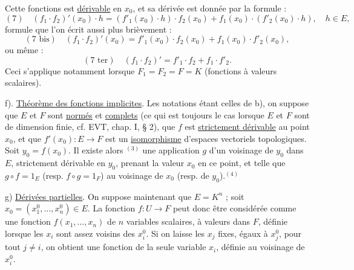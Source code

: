 Cette fonctions est \uline{dérivable} en $x_0$, et sa dérivée est donnée par la formule :
\[
(7)\quad (f_1\cdot f_2)'(x_0)\cdot h=(f'_1(x_0)\cdot h)\cdot f_2(x_0)+f_1(x_0)\cdot(f'_2(x_0)\cdot h),\quad h\in E,
\]
formule que l'on écrit aussi plus brièvement :
\[
(7\text{ bis})\quad (f_1\cdot f_2)'(x_0)=f'_1(x_0)\cdot f_2(x_0)+f_1(x_0)\cdot f'_2(x_0),
\]
ou même :
\[
(7\text{ ter})\quad (f_1\cdot f_2)'=f'_1\cdot f_2+f_1\cdot f'_2.
\]
Ceci s'applique notamment lorsque $F_1=F_2=F=K$ (fonctions à valeurs scalaires).

f). \uline{Théorème des fonctions implicites}. Les notations étant celles de b), on suppose que $E$ et $F$ sont \uline{normés} et \uline{complets} (ce qui est toujours le cas lorsque $E$ et $F$ sont de dimension finie, cf. EVT, chap. I, § 2), que $f$ est \uline{strictement dérivable} au point $x_0$, et que $f'(x_0):E\longrightarrow F$ est un \uline{isomorphisme} d'espaces vectoriels topologiques. Soit $y_0=f(x_0)$. Il existe alors $^{(3)}$ une application $g$ d'un voisinage de $y_0$ dans $E$, strictement dérivable en $y_0$, prenant la valeur $x_0$ en ce point, et telle que $g\circ f=1_E$ (resp. $f\circ g=1_F$) au voisinage de $x_0$ (resp. de $y_0$).$^{(4)}$

g) \uline{Dérivées partielles}. On suppose maintenant que $E=K^n$ ; soit $x_0=(x_1^0,\ldots,x_n^0)\in E$. La fonction $f:U\to F$ peut donc être considérée comme une fonction $f(x_1,\ldots,x_n)$ de $n$ variables scalaires, à valeurs dans $F$, définie lorsque les $x_i$ sont assez voisins des $x_i^0$. Si on laisse les $x_j$ fixes, égaux à $x_j^0$, pour tout $j\neq i$, on obtient une fonction de la seule variable $x_i$, définie au voisinage de $x_i^0$.

